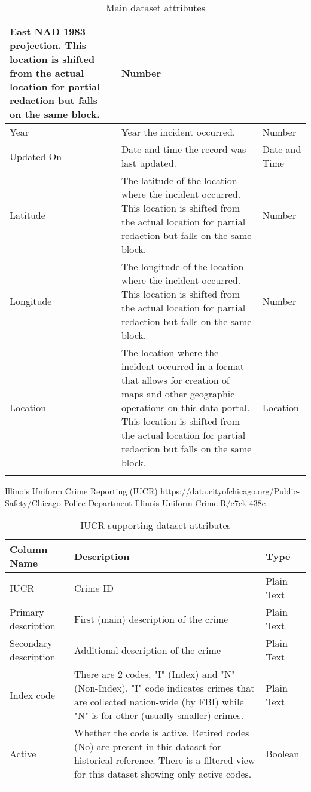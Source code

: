 \begin{center}
\begin{longtable}{|m{6em}|m{18em}|m{7em}|}
            East NAD 1983 projection. This location is shifted from the actual location for 
            partial redaction but falls on the same block. & 
            Number\\
        \hline
            Year & 
            Year the incident occurred. & 
            Number\\
        \hline
            Updated On & 
            Date and time the record was last updated. & 
            Date and Time\\
        \hline
            Latitude & 
            The latitude of the location where the incident occurred. This location is shifted 
            from the actual location for partial redaction but falls on the same block. & 
            Number\\
        \hline
            Longitude & 
            The longitude of the location where the incident occurred. This location is shifted 
            from the actual location for partial redaction but falls on the same block. & 
            Number\\
        \hline
            Location & 
            The location where the incident occurred in a format that allows for creation of 
            maps and other geographic operations on this data portal. This location is shifted 
            from the actual location for partial redaction but falls on the same block. & 
            Location\\
        \hline
    \caption{Main dataset attributes}
\end{longtable}
\end{center}

Illinois Uniform Crime Reporting (IUCR) \newline
https://data.cityofchicago.org/Public-Safety/Chicago-Police-Department-Illinois-Uniform-Crime-R/c7ck-438e
\begin{center}
\begin{longtable}{|m{6em}|m{18em}|m{7em}|}
    \hline
    Column Name & 
    Description & 
    Type\\
    \hline
    IUCR & 
    Crime ID & 
    Plain Text\\
    \hline
    Primary description & 
    First (main) description of the crime & 
    Plain Text\\
    \hline
    Secondary description & 
    Additional description of the crime & 
    Plain Text\\
    \hline
    Index code & 
    There are 2 codes, "I" (Index) and "N" (Non-Index). "I" code indicates crimes that are collected nation-wide (by FBI) while "N" is for other (usually smaller) crimes. & 
    Plain Text\\
    \hline
    Active & 
    Whether the code is active. Retired codes (No) are present in this dataset for historical reference. There is a filtered view for this dataset showing only active codes. & 
    Boolean\\
    \hline
\caption{IUCR supporting dataset attributes}
\end{longtable}
\end{center}

